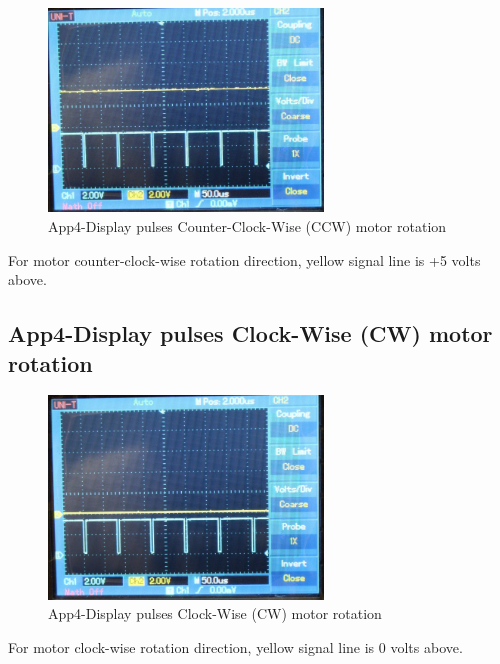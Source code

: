 \begin{figure}[htbp]
	\begin{center}
		\includegraphics[width=0.65\textwidth]{./07-images/img-Ch4App/pulsing-for-CCW-motor-rotation.jpg}
		\caption{App4-Display pulses Counter-Clock-Wise (CCW) motor rotation}
		\label{fig:App4-pulsing-for-CCW-motor-rotation.jpg}
	\end{center}
\end{figure}
For motor counter-clock-wise rotation direction, yellow signal line is +5 volts above.

\subsection{App4-Display pulses Clock-Wise (CW) motor rotation}

\begin{figure}[htbp]
	\begin{center}
		\includegraphics[width=0.65\textwidth]{./07-images/img-Ch4App/pulsing-for-CW-motor-rotation.jpg}
		\caption{App4-Display pulses Clock-Wise (CW) motor rotation}
		\label{fig:App4-pulsing-for-CW-motor-rotation.jpg}
	\end{center}
\end{figure}
For motor clock-wise rotation direction, yellow signal line is 0 volts above.

